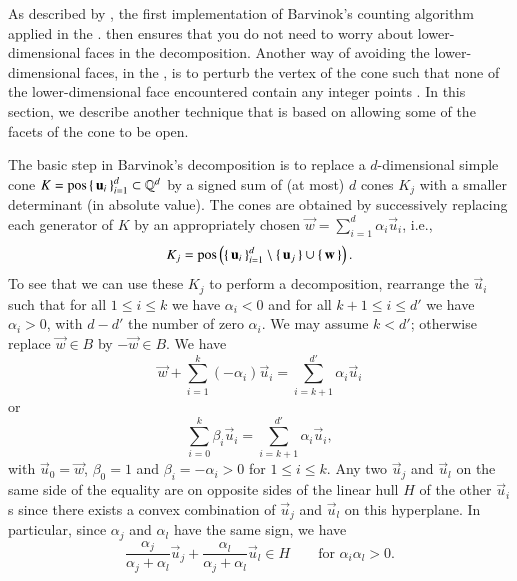 As described by , the first
implementation of Barvinok's counting algorithm applied
  in the .
  then ensures that you
do not need to worry about lower-dimensional faces in the decomposition.
Another way of avoiding the lower-dimensional faces, in the ,
is to perturb the vertex of the cone such that none of the lower-dimensional
face encountered contain any integer points .
In this section, we describe another technique that is based on allowing
some of the facets of the cone to be open.

The basic step in Barvinok's decomposition is to replace a
$d$-dimensional simple cone 
$K = \poshull \lb\, \vec u_i \,\rb_{i=1}^d \subset \QQ^d$
by a signed sum of (at most) $d$ cones $K_j$
with a smaller determinant (in absolute value).
The cones are obtained by successively replacing each generator
of $K$ by an appropriately chosen
$\vec w = \sum_{i=1}^d \alpha_i \vec u_i$, i.e.,
\begin{equation}
\label{eq:K_j}
K_j = 
\poshull \left(\lb\, \vec u_i \,\rb_{i=1}^d 
\setminus \{\, \vec u_j \,\} \cup \{\, \vec w \,\}\right)
.
\end{equation}
To see that we can use these $K_j$ to perform a decomposition,
rearrange the $\vec u_i$ such that for all $1 \le i \le k$ we have
$\alpha_i < 0$ and for all $k+1 \le i \le d'$ we have $\alpha_i > 0$,
with $d - d'$ the number of zero $\alpha_i$.
We may assume $k < d'$; otherwise replace $\vec w \in B$ by
$-\vec w \in B$.  We have
$$
\vec w + \sum_{i=1}^k (-\alpha_i) \vec u_i =
\sum_{i=k+1}^{d'} \alpha_i \vec u_i
$$
or
\begin{equation}
\label{eq:sub}
\sum_{i=0}^k \beta_i \vec u_i =
\sum_{i=k+1}^{d'} \alpha_i \vec u_i
,
\end{equation}
with $\vec u_0 = \vec w$, $\beta_0 = 1$ and $\beta_i = -\alpha_i > 0$
for $1 \le i \le k$.  Any two $\vec u_j$ and $\vec u_l$ on the same side
of the equality are on opposite sides of the linear hull $H$ of
the other $\vec u_i$s since there exists a convex combination
of $\vec u_j$ and $\vec u_l$ on this hyperplane.
In particular, since $\alpha_j$ and $\alpha_l$ have the same sign,
we have
\begin{equation}
\label{eq:opposite}
\frac {\alpha_j}{\alpha_j+\alpha_l} \vec u_j
+
\frac {\alpha_l}{\alpha_j+\alpha_l} \vec u_l
\in H
\qquad\text{for $\alpha_i \alpha_l > 0$}
.
\end{equation}
